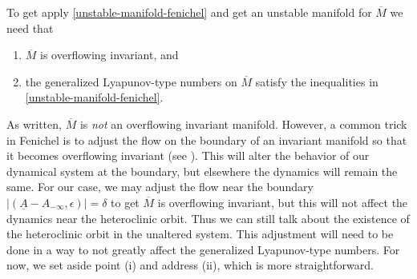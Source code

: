To get apply \cref{unstable-manifold-fenichel} and get an unstable manifold for \(\overline M\) we need that 
\begin{enumerate}[label=(\roman*)]
	\item \(\overline M\) is overflowing invariant, and 
	\item the generalized Lyapunov-type numbers on \(\overline M\) satisfy the inequalities in \cref{unstable-manifold-fenichel}.
\end{enumerate}
As written, \(\overline M\) is \emph{not} an overflowing invariant manifold. However, a common trick in Fenichel is to adjust the flow on the boundary of an invariant manifold so that it becomes overflowing invariant (see \cite[\S 6.3]{wiggins1994normally}). This will alter the behavior of our dynamical system at the boundary, but elsewhere the dynamics will remain the same. For our case, we may adjust the flow near the boundary \(|(\underline A - A_{-\infty},  \epsilon)| = \delta\) to get \(\overline M\) is overflowing invariant, but this will not affect the dynamics near the heteroclinic orbit. Thus we can still talk about the existence of the heteroclinic orbit in the unaltered system. This adjustment will need to be done in a way to not greatly affect the generalized Lyapunov-type numbers. For now, we set aside point (i) and address (ii), which is more straightforward. 


